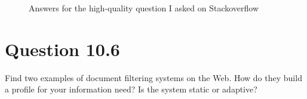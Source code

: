 \documentclass[letterpaper,11pt]{article}
\begin{document}
\begin{figure}[H]
	\centering
	\caption{Answers for the high-quality question I asked on Stackoverflow}
	\label{fig:10_5_high_quality_answer}
\end{figure}


\noindent\makebox[\linewidth]{\rule{\textwidth}{0.4pt}}

\section*{Question 10.6}
\begin{spverbatim}
Find two examples of document filtering systems on the Web. How do they build a profile for your information need? Is the system static or adaptive?
\end{spverbatim}
\end{document}
